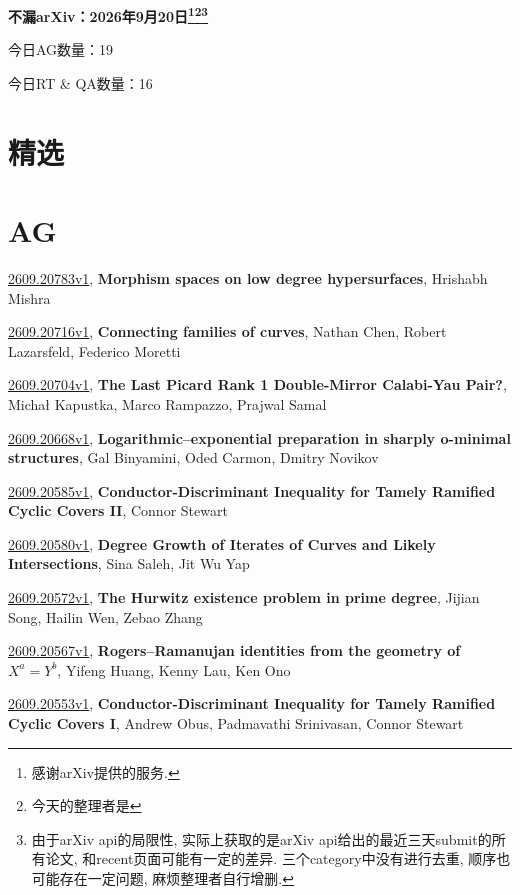 \documentclass[9pt, a4paper]{article}
\theoremstyle{plain}
\theoremstyle{definition}
\theoremstyle{remark}
\newcommand{\arxiv}[3]{\href{https://arxiv.org/abs/#1}{#1}, \textbf{\textcolor{arxivblue}{#2}}, #3}
\newcommand{\AGnumber}{19}
\newcommand{\RTQAnumber}{16}
\newcommand{\NewestDate}{2026年9月20日}
\newcommand{\todayarXiver}{} %
\begin{document}
\begin{center}
    \Huge\textbf{不漏arXiv：\NewestDate\footnote{感谢arXiv提供的服务.}\footnote{今天的整理者是\todayarXiver}\footnote{由于arXiv api的局限性, 实际上获取的是arXiv api给出的最近三天submit的所有论文, 和recent页面可能有一定的差异. 三个category中没有进行去重, 顺序也可能存在一定问题, 麻烦整理者自行增删.}} \\
\end{center}

\setcounter{section}{-1}

\begin{center}
    今日AG数量：\AGnumber
    
    今日RT \& QA数量：\RTQAnumber
    
\end{center}


\section{精选}


\section{AG}
\arxiv{2609.20783v1}{Morphism spaces on low degree hypersurfaces}{Hrishabh Mishra}

\arxiv{2609.20716v1}{Connecting families of curves}{Nathan Chen, Robert Lazarsfeld, Federico Moretti}

\arxiv{2609.20704v1}{The Last Picard Rank 1 Double-Mirror Calabi-Yau Pair?}{Michał Kapustka, Marco Rampazzo, Prajwal Samal}

\arxiv{2609.20668v1}{Logarithmic--exponential preparation in sharply o-minimal structures}{Gal Binyamini, Oded Carmon, Dmitry Novikov}

\arxiv{2609.20585v1}{Conductor-Discriminant Inequality for Tamely Ramified Cyclic Covers II}{Connor Stewart}

\arxiv{2609.20580v1}{Degree Growth of Iterates of Curves and Likely Intersections}{Sina Saleh, Jit Wu Yap}

\arxiv{2609.20572v1}{The Hurwitz existence problem in prime degree}{Jijian Song, Hailin Wen, Zebao Zhang}

\arxiv{2609.20567v1}{Rogers--Ramanujan identities from the geometry of $X^a=Y^b$}{Yifeng Huang, Kenny Lau, Ken Ono}

\arxiv{2609.20553v1}{Conductor-Discriminant Inequality for Tamely Ramified Cyclic Covers I}{Andrew Obus, Padmavathi Srinivasan, Connor Stewart}
\end{document}
